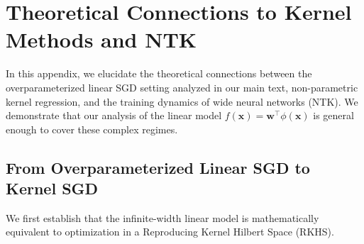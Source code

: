\documentclass{article}
\theoremstyle{definition}
\theoremstyle{definition}
\theoremstyle{plain}
\theoremstyle{plain}
\theoremstyle{plain}
\theoremstyle{plain}
\theoremstyle{plain}
\newcommand{\te}{\mathrm{T}}
\newcommand{\st}{\mathrm{S}}
\newcommand{\ts}{\mathrm{T2S}}
\begin{document}





\section{Theoretical Connections to Kernel Methods and NTK}
\label{app:connection_kernel_ntk}

In this appendix, we elucidate the theoretical connections between the overparameterized linear SGD setting analyzed in our main text, non-parametric kernel regression, and the training dynamics of wide neural networks (NTK). We demonstrate that our analysis of the linear model $f(\mathbf{x}) = \mathbf{w}^\top \phi(\mathbf{x})$ is general enough to cover these complex regimes.

\subsection{From Overparameterized Linear SGD to Kernel SGD}
\label{app:sub:linear_to_kernel}

We first establish that the infinite-width linear model is mathematically equivalent to optimization in a Reproducing Kernel Hilbert Space (RKHS). 
\end{document}
